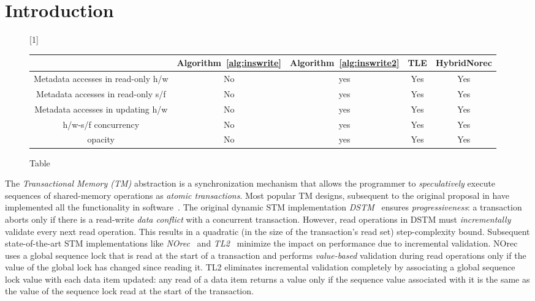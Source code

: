 \section{Introduction}
\label{sec:intro}
%
\begin{figure*}[!ht]
      
     \scalebox{1}[1]{
     \begin{tabularx}{\textwidth}{c|c|c|c|c}
	~~~~~ & Algorithm~\ref{alg:inswrite} & Algorithm~\ref{alg:inswrite2} & TLE & HybridNorec\\ \hline
	Metadata accesses in read-only h/w & No & yes & Yes & Yes \\ \hline
	Metadata accesses in read-only s/f & No & yes & Yes & Yes \\ \hline
	Metadata accesses in updating h/w & No & yes & Yes & Yes \\ \hline
	h/w-s/f concurrency & No & yes & Yes & Yes \\ \hline
	opacity & No & yes & Yes & Yes \\  \hline
   \end{tabularx}
\caption{Table}\label{fig:main}    
}
\end{figure*}
%
The \emph{Transactional Memory (TM)} abstraction is a synchronization mechanism 
that allows the programmer to \emph{speculatively} execute sequences of shared-memory
operations as \emph{atomic transactions}.
Most popular TM designs, subsequent to the original proposal in \cite{HM93} 
have implemented all the functionality in software~\cite{norec, ST95,HLM+03, astm, fraser}.
The original dynamic STM implementation \emph{DSTM}~\cite{HLM+03} ensures \emph{progressiveness}: 
a transaction aborts only if there is a read-write \emph{data conflict} with a concurrent
transaction. However, read operations in DSTM must \emph{incrementally} validate
every next read operation. This results in a quadratic  (in the size of the transaction's read
set) step-complexity bound. Subsequent state-of-the-art STM 
implementations like \emph{NOrec}~\cite{norec} and \emph{TL2}~\cite{DSS06}
minimize the impact on performance due to incremental validation.
NOrec uses a global sequence lock that is read at the start of a transaction and performs \emph{value-based}
validation during read operations only if the value of the global lock has changed since reading it.
TL2 eliminates incremental validation completely by associating a global sequence lock
value with each data item updated: any read of a data item returns
a value only if the sequence value associated with it is the same as the 
value of the sequence lock read at the start of the transaction. 

